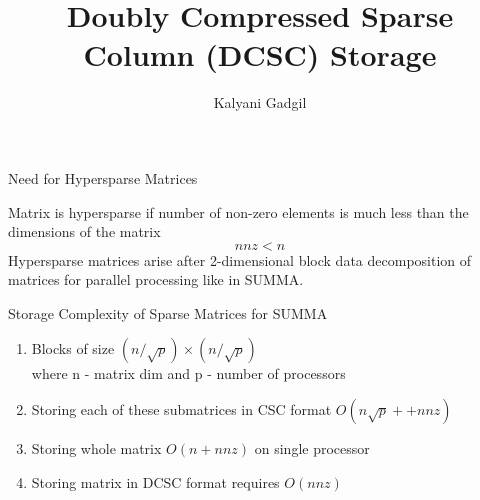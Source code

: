 \documentclass[12pt, usenames, dvipsnames]{beamer}
\author{Kalyani Gadgil}
\title{Doubly Compressed Sparse Column (DCSC) Storage }
\begin{document}
\newcommand\hlgreen[1]{\tikz[overlay, remember picture,baseline=-\the\dimexpr\fontdimen22\textfont2\relax]\node[rectangle,fill=YellowOrange!100,rounded corners,fill opacity = 0.2,draw,thick,text opacity =1] {$#1$};} 

\newcommand\hlblue[1]{\tikz[overlay, remember picture,baseline=-\the\dimexpr\fontdimen22\textfont2\relax]\node[rectangle,fill=blue!20,rounded corners,fill opacity = 0.2,draw,thick,text opacity =1] {$#1$};} 

\newcommand\hlorange[1]{\tikz[overlay, remember picture,baseline=-\the\dimexpr\fontdimen22\textfont2\relax]\node[rectangle,fill=YellowGreen!80,rounded corners,fill opacity = 0.2,draw,thick,text opacity =1] {$#1$};}

\newcommand\hlpink[1]{\tikz[overlay, remember picture,baseline=-\the\dimexpr\fontdimen22\textfont2\relax]\node[rectangle,fill=Magenta!80,rounded corners,fill opacity = 0.2,draw,thick,text opacity =1] {$#1$};} 

\newcommand{\tikzmark}[2]{\tikz[overlay, remember picture] \node[inner sep=0pt, outer sep=0pt, anchor=base] (#1) {#2};}

 
\begin{frame}
\titlepage
\end{frame}

\begin{frame}{Need for Hypersparse Matrices}
	\begin{center}
		Matrix is hypersparse if number of non-zero elements is much less than the dimensions of the matrix $$ nnz < n $$
		Hypersparse matrices arise after 2-dimensional block data decomposition of matrices for parallel processing like in SUMMA. \\
	\end{center}
\end{frame}

\begin{frame}{Storage Complexity of Sparse Matrices for SUMMA}
	\begin{enumerate}
	\item Blocks of size $(n/\sqrt{p})\times (n/\sqrt{p})$ \\ where n - matrix dim and p - number of processors
	\item Storing each of these submatrices in CSC format $O(n\sqrt{p} ++ nnz)$
	\item Storing whole matrix $O(n + nnz)$ on single processor
	\item Storing matrix in DCSC format requires $O(nnz)$
\end{enumerate}		

\end{frame}
\end{document}
